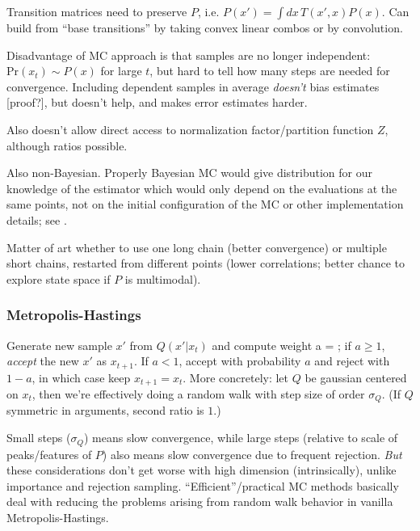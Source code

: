 \documentclass[notitlepage,openany,11pt]{report}
\numberwithin{equation}{section}
\theoremstyle{plain}%
\begin{document}
Transition matrices need to preserve $P$, i.e. $P(x') = \int \! dx \, T(x', x) P(x)$. Can build from ``base transitions'' by taking convex linear combos or by convolution. 

Disadvantage of MC approach is that samples are no longer independent: $\text{Pr}(x_t) \sim P(x)$ for large $t$, but hard to tell how many steps are needed for convergence. Including dependent samples in average \emph{doesn't} bias estimates [proof?], but doesn't help, and makes error estimates harder.

Also doesn't allow direct access to normalization factor/partition function $Z$, although ratios possible.

Also non-Bayesian. Properly Bayesian MC would give distribution for our knowledge of the estimator which would only depend on the evaluations at the same points, not on the initial configuration of the MC or other implementation details; see \citep{GhahramaniRasmussen:03}.

Matter of art whether to use one long chain (better convergence) or multiple short chains, restarted from different points (lower correlations; better chance to explore state space if $P$ is multimodal). 

\subsubsection{Metropolis-Hastings}
Generate new sample $x'$ from $Q(x' | x_t)$ and compute weight
\be
a =  ;
\ee
if $a \geq 1$, \emph{accept} the new $x'$ as $x_{t+1}$. If $a < 1$, accept with probability $a$ and reject with $1-a$, in which case keep $x_{t+1} = x_{t}.$ 
More concretely: let $Q$ be gaussian centered on $x_t$, then we're effectively doing a random walk with step size of order $\sigma_{Q}$. (If $Q$ symmetric in arguments, second ratio is $1$.)

Small steps ($\sigma_{Q}$) means slow convergence, while large steps (relative to scale of peaks/features of $P$) also means slow convergence due to frequent rejection.  \emph{But} these considerations don't get worse with high dimension (intrinsically), unlike importance and rejection sampling. ``Efficient''/practical MC methods basically deal with reducing the problems arising from random walk behavior in vanilla Metropolis-Hastings.
\end{document}
